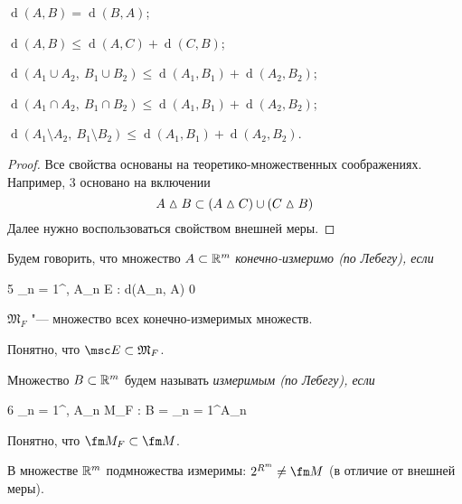 \begin{props}
	\item $ \operatorname d(A, B) = \operatorname d(B, A) $;
	\item $ \operatorname d(A, B) \le \operatorname d(A, C) + \operatorname d(C, B) $;
	\item $ \operatorname d(A_1 \cup A_2, ~ B_1 \cup B_2) \le \operatorname d(A_1, B_1) + \operatorname d(A_2, B_2) $;
	\item $ \operatorname d(A_1 \cap A_2, ~ B_1 \cap B_2) \le \operatorname d(A_1, B_1) + \operatorname d(A_2, B_2) $;
	\item $ \operatorname d(A_1 \setminus A_2, ~ B_1 \setminus B_2) \le \operatorname d(A_1, B_1) + \operatorname d(A_2, B_2) $.
\end{props}

\begin{proof}
	Все свойства основаны на теоретико-множественных соображениях. Например, 3 основано на включении
	$$ A \vartriangle B \subset (A \vartriangle C) \cup (C \vartriangle B) $$
	Далее нужно воспользоваться свойством  внешней меры.
\end{proof}

\begin{definition}
	Будем говорить, что множество $ A \subset \mathbb{R}^m $ \it{конечно-измеримо (по Лебегу)}, если
	\begin{equ}5
		\exist {}_{n = 1}^\infty, \quad A_n \in \msc E : \quad \operatorname d(A_n, A)  0
	\end{equ}
\end{definition}

\begin{notation}
	$ \mathfrak M_F $ "--- множество всех конечно-измеримых множеств.
\end{notation}

Понятно, что $ \msc E \sub \mathfrak M_F $.

\begin{definition}
	Множество $ B \subset \mathbb{R}^m $ будем называть \it{измеримым (по Лебегу)}, если
	\begin{equ}6
		\exist {}_{n = 1}^\infty, \quad A_n \in \fm M_F : \quad B = \bigcup_{n = 1}^\infty A_n
	\end{equ}
\end{definition}

Понятно, что $ \fm M_F \sub \fm M $.

\begin{remark}
	В множестве $ \mathbb{R}^m $  подмножества измеримы: $ 2^{R^m} \neq \fm M $ (в отличие от внешней меры).
\end{remark}


